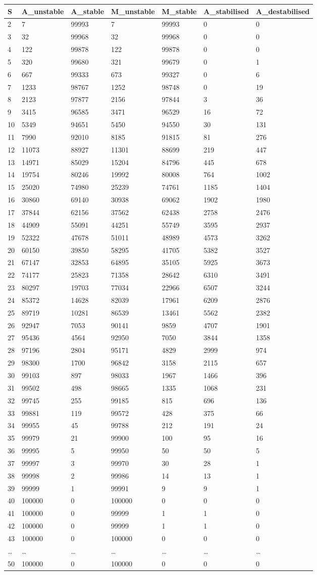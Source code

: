 \documentclass[]{article}
\begin{document}
\begin{longtable}[]{@{}lllllll@{}}
\toprule
S & A\_unstable & A\_stable & M\_unstable & M\_stable & A\_stabilised &
A\_destabilised\tabularnewline
\midrule
\endhead
2 & 7 & 99993 & 7 & 99993 & 0 & 0\tabularnewline
3 & 32 & 99968 & 32 & 99968 & 0 & 0\tabularnewline
4 & 122 & 99878 & 122 & 99878 & 0 & 0\tabularnewline
5 & 320 & 99680 & 321 & 99679 & 0 & 1\tabularnewline
6 & 667 & 99333 & 673 & 99327 & 0 & 6\tabularnewline
7 & 1233 & 98767 & 1252 & 98748 & 0 & 19\tabularnewline
8 & 2123 & 97877 & 2156 & 97844 & 3 & 36\tabularnewline
9 & 3415 & 96585 & 3471 & 96529 & 16 & 72\tabularnewline
10 & 5349 & 94651 & 5450 & 94550 & 30 & 131\tabularnewline
11 & 7990 & 92010 & 8185 & 91815 & 81 & 276\tabularnewline
12 & 11073 & 88927 & 11301 & 88699 & 219 & 447\tabularnewline
13 & 14971 & 85029 & 15204 & 84796 & 445 & 678\tabularnewline
14 & 19754 & 80246 & 19992 & 80008 & 764 & 1002\tabularnewline
15 & 25020 & 74980 & 25239 & 74761 & 1185 & 1404\tabularnewline
16 & 30860 & 69140 & 30938 & 69062 & 1902 & 1980\tabularnewline
17 & 37844 & 62156 & 37562 & 62438 & 2758 & 2476\tabularnewline
18 & 44909 & 55091 & 44251 & 55749 & 3595 & 2937\tabularnewline
19 & 52322 & 47678 & 51011 & 48989 & 4573 & 3262\tabularnewline
20 & 60150 & 39850 & 58295 & 41705 & 5382 & 3527\tabularnewline
21 & 67147 & 32853 & 64895 & 35105 & 5925 & 3673\tabularnewline
22 & 74177 & 25823 & 71358 & 28642 & 6310 & 3491\tabularnewline
23 & 80297 & 19703 & 77034 & 22966 & 6507 & 3244\tabularnewline
24 & 85372 & 14628 & 82039 & 17961 & 6209 & 2876\tabularnewline
25 & 89719 & 10281 & 86539 & 13461 & 5562 & 2382\tabularnewline
26 & 92947 & 7053 & 90141 & 9859 & 4707 & 1901\tabularnewline
27 & 95436 & 4564 & 92950 & 7050 & 3844 & 1358\tabularnewline
28 & 97196 & 2804 & 95171 & 4829 & 2999 & 974\tabularnewline
29 & 98300 & 1700 & 96842 & 3158 & 2115 & 657\tabularnewline
30 & 99103 & 897 & 98033 & 1967 & 1466 & 396\tabularnewline
31 & 99502 & 498 & 98665 & 1335 & 1068 & 231\tabularnewline
32 & 99745 & 255 & 99185 & 815 & 696 & 136\tabularnewline
33 & 99881 & 119 & 99572 & 428 & 375 & 66\tabularnewline
34 & 99955 & 45 & 99788 & 212 & 191 & 24\tabularnewline
35 & 99979 & 21 & 99900 & 100 & 95 & 16\tabularnewline
36 & 99995 & 5 & 99950 & 50 & 50 & 5\tabularnewline
37 & 99997 & 3 & 99970 & 30 & 28 & 1\tabularnewline
38 & 99998 & 2 & 99986 & 14 & 13 & 1\tabularnewline
39 & 99999 & 1 & 99991 & 9 & 9 & 1\tabularnewline
40 & 100000 & 0 & 100000 & 0 & 0 & 0\tabularnewline
41 & 100000 & 0 & 99999 & 1 & 1 & 0\tabularnewline
42 & 100000 & 0 & 99999 & 1 & 1 & 0\tabularnewline
43 & 100000 & 0 & 100000 & 0 & 0 & 0\tabularnewline
\ldots{} & \ldots{} & \ldots{} & \ldots{} & \ldots{} & \ldots{} &
\ldots{}\tabularnewline
50 & 100000 & 0 & 100000 & 0 & 0 & 0\tabularnewline
\bottomrule
\end{longtable}
\end{document}

